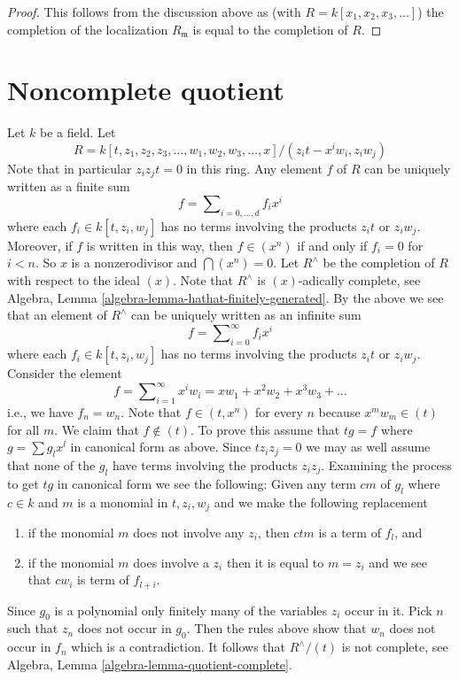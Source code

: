 \begin{proof}
This follows from the discussion above as (with $R = k[x_1, x_2, x_3, \ldots]$)
the completion of the localization $R_{\mathfrak m}$ is equal to the
completion of $R$.
\end{proof}





\section{Noncomplete quotient}
\label{section-noncomplete-quotient}

\noindent
Let $k$ be a field. Let
$$
R = k[t, z_1, z_2, z_3, \ldots, w_1, w_2, w_3, \ldots, x]/
(z_it - x^iw_i, z_i w_j)
$$
Note that in particular $z_iz_jt = 0$ in this ring. Any element $f$ of $R$
can be uniquely written as a finite sum
$$
f = \sum\nolimits_{i = 0, \ldots, d} f_i x^i
$$
where each $f_i \in k[t, z_i, w_j]$ has no terms involving the products
$z_it$ or $z_iw_j$. Moreover, if $f$ is written in this way, then
$f \in (x^n)$ if and only if $f_i = 0$ for $i < n$.
So $x$ is a nonzerodivisor and $\bigcap (x^n) = 0$.
Let $R^\wedge$ be the completion of $R$ with respect to the ideal $(x)$.
Note that $R^\wedge$ is $(x)$-adically complete, see
Algebra, Lemma \ref{algebra-lemma-hathat-finitely-generated}.
By the above we see that an element of $R^\wedge$ can be uniquely written
as an infinite sum
$$
f = \sum\nolimits_{i = 0}^\infty f_i x^i
$$
where each $f_i \in k[t, z_i, w_j]$ has no terms involving the products
$z_it$ or $z_iw_j$. Consider the element
$$
f = \sum\nolimits_{i = 1}^\infty x^i w_i =
xw_1 + x^2w_2 + x^3w_3 + \ldots
$$
i.e., we have $f_n = w_n$. Note that $f \in (t , x^n)$ for every $n$
because $x^mw_m \in (t)$ for all $m$.
We claim that $f \not \in (t)$. To prove this assume that
$tg = f$ where $g = \sum g_lx^l$ in canonical form as above.
Since $tz_iz_j = 0$ we may as well assume that none of the $g_l$ have
terms involving the products $z_iz_j$. Examining the process to
get $tg$ in canonical form we see the following:
Given any term $c m$ of $g_l$ where $c \in k$ and $m$ is a
monomial in $t, z_i, w_j$ and we make the following replacement
\begin{enumerate}
\item if the monomial $m$ does not involve any $z_i$, then $ctm$ is
a term of $f_l$, and
\item if the monomial $m$ does involve a $z_i$ then it is equal to
$m = z_i$ and we see that $cw_i$ is term of $f_{l + i}$.
\end{enumerate}
Since $g_0$ is a polynomial only finitely many of the variables $z_i$
occur in it. Pick $n$ such that $z_n$ does not occur in $g_0$.
Then the rules above show that $w_n$ does not occur in $f_n$ which is
a contradiction. It follows that $R^\wedge/(t)$ is not complete, see
Algebra, Lemma \ref{algebra-lemma-quotient-complete}.

